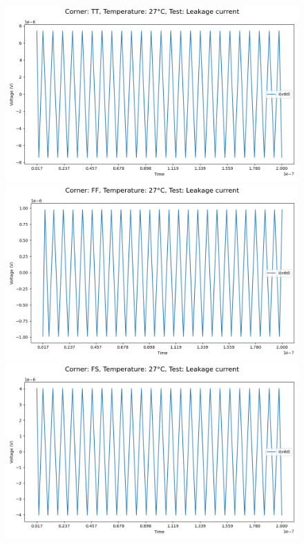 \begin{figure}[H]
    \centering
    \includegraphics[height= 0.21\textheight]{figures/aimspice/TT/27/I.csv.png}
    \vspace{5pt}
    \includegraphics[height= 0.21\textheight]{figures/aimspice/FF/27/I.csv.png}
    \vspace{5pt}
    \includegraphics[height= 0.21\textheight]{figures/aimspice/FS/27/I.csv.png}

\end{figure}
